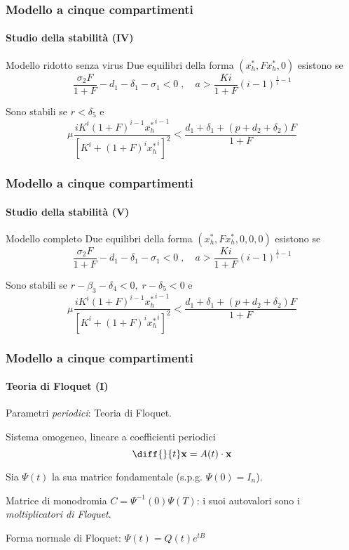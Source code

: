 \documentclass[]{beamer}
\begin{document}
\begin{frame}
    \frametitle{Modello a cinque compartimenti}
    \framesubtitle{Studio della stabilità (IV)}

    \begin{block}{Modello ridotto senza virus}
        Due equilibri della forma $(x_h^*, F x_h^*, 0)$ esistono se
        $$\frac{\sigma_2 F}{1+F} - d_1 -\delta_1 -\sigma_1 < 0 \; , \quad %
            a > \frac{Ki}{1+F} {(i-1)}^{\frac{1}{i} -1}$$

        \pause
        Sono stabili se $r < \delta_5$ e
        $$\mu \frac{ i K^i (1+F)^{i-1}{x_h^*}^{i-1} }{ {\left[ K^i +(1+F)^i {x_h^*}^i \right]}^2 }
            < \frac{d_1 + \delta_1 + (p+d_2+\delta_2)F}{1+F}$$
    \end{block}
\end{frame}

\begin{frame}
    \frametitle{Modello a cinque compartimenti}
    \framesubtitle{Studio della stabilità (V)}

    \begin{block}{Modello completo}
        Due equilibri della forma $(x_h^*, F x_h^*, 0, 0, 0)$ esistono se
        $$\frac{\sigma_2 F}{1+F} - d_1 -\delta_1 -\sigma_1 < 0 \; , \quad %
        a > \frac{Ki}{1+F} {(i-1)}^{\frac{1}{i} -1}$$

        \pause Sono stabili se $r - \beta_3 - \delta_4 < 0 , \; r - \delta_5 < 0$ e
        $$\mu \frac{ i K^i (1+F)^{i-1}{x_h^*}^{i-1} }{ {\left[ K^i +(1+F)^i {x_h^*}^i \right]}^2 }
            < \frac{d_1 + \delta_1 + (p+d_2+\delta_2)F}{1+F}$$
    \end{block}
\end{frame}

\begin{frame}
    \frametitle{Modello a cinque compartimenti}
    \framesubtitle{Teoria di Floquet (I)}

    Parametri \emph{periodici}: Teoria di Floquet.

    \vspace{1em}
    Sistema omogeneo, lineare a coefficienti periodici
    $$\diff{}{t} \mathbf{x} = A(t) \cdot \mathbf{x}$$

    \pause
    Sia $\Psi (t)$ la sua matrice fondamentale
    \pause (s.p.g. $\Psi (0) = I_n$).

    \pause
    \vspace{1em}
    Matrice di monodromia $C= \Psi^{-1} (0) \Psi (T)$:
    \pause
    i suoi autovalori sono i \emph{moltiplicatori di Floquet}.

    \pause
    \vspace{1em}
    Forma normale di Floquet: $\Psi (t) = Q(t) e^{tB}$
\end{frame}
\end{document}
